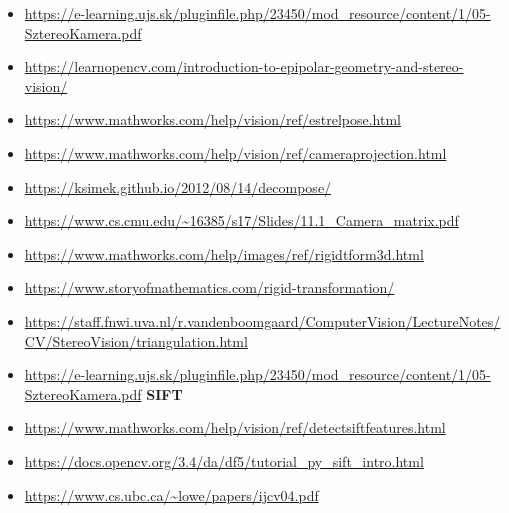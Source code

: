 \documentclass[12pt]{report}
\begin{document}
\begin{itemize}
            \item \url{https://e-learning.ujs.sk/pluginfile.php/23450/mod_resource/content/1/05-SztereoKamera.pdf}
            \item \url{https://learnopencv.com/introduction-to-epipolar-geometry-and-stereo-vision/}
            \item \url{https://www.mathworks.com/help/vision/ref/estrelpose.html}
            \item \url{https://www.mathworks.com/help/vision/ref/cameraprojection.html}
            \item \url{https://ksimek.github.io/2012/08/14/decompose/}
            \item \url{https://www.cs.cmu.edu/~16385/s17/Slides/11.1_Camera_matrix.pdf}
            \item \url{https://www.mathworks.com/help/images/ref/rigidtform3d.html}
            \item \url{https://www.storyofmathematics.com/rigid-transformation/}
            \item \url{https://staff.fnwi.uva.nl/r.vandenboomgaard/ComputerVision/LectureNotes/CV/StereoVision/triangulation.html}
            \item \url{https://e-learning.ujs.sk/pluginfile.php/23450/mod_resource/content/1/05-SztereoKamera.pdf}
        \textbf{SIFT}
            \item \url{https://www.mathworks.com/help/vision/ref/detectsiftfeatures.html}
            \item \url{https://docs.opencv.org/3.4/da/df5/tutorial_py_sift_intro.html}
            \item \url{https://www.cs.ubc.ca/~lowe/papers/ijcv04.pdf}
        \end{itemize}
\end{document}
